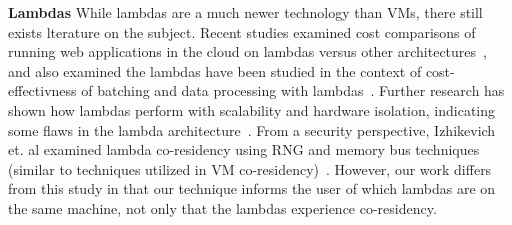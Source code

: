 \noindent \textbf{Lambdas} 
While lambdas are a much newer technology than VMs, there still exists lterature
on the subject. Recent studies examined cost comparisons of running web
applications in the cloud on lambdas versus other
architectures~\cite{villamizar2016}, and also examined the lambdas have been
studied in the context of cost-effectivness of batching and data processing with
lambdas~\cite{kiran2015}.  Further research has shown how lambdas perform with
scalability and hardware isolation, indicating some flaws in the lambda
architecture~\cite{wangusenix2018}. From a security perspective, Izhikevich et.
al examined lambda co-residency using RNG and memory bus techniques (similar to
techniques utilized in VM co-residency)~\cite{izhikevich2018}. However, our work
differs from this study in that our technique informs the user of which lambdas
are on the same machine, not only that the lambdas experience co-residency.
